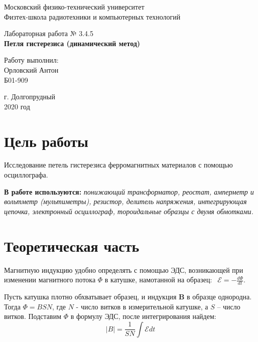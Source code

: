 \documentclass[a4paper,12pt]{article}
\begin{document}
\begin{titlepage}
	\begin{center}
		\large 	Московский физико-технический университет \\
		Физтех-школа радиотехники и компьютерных технологий\\
		\vspace{0.2cm}
		
		\vspace{4.5cm}
		Лабораторная работа № 3.4.5 \\ \vspace{0.2cm}
		\LARGE \textbf{Петля гистерезиса
		(динамический метод)}
	\end{center}
	\vspace{2.3cm} \large
	
	\begin{center}
		Работу выполнил: \\
		Орловский Антон \\
		Б01-909

		
	\end{center}
	
	\begin{center} \vspace{60mm}
		г. Долгопрудный \\
		 2020 год
	\end{center}
\end{titlepage}




\section{Цель работы} Исследование петель гистерезиса ферромагнитных материалов с помощью осциллографа.

\textbf{В работе используются:} \textit{понижающий трансформатор, реостат, амперметр и вольтметр (мультиметры), резистор, делитель напряжения, интегрирующая цепочка, электронный осциллограф, тороидальные образцы с двумя обмотками.}
	
\section{Теоретическая часть}		 
	Магнитную индукцию удобно определять с помощью ЭДС, возникающей при изменении магнитного потока $\Phi$ в катушке, намотанной на образец: $~~\mathscr{E}=-\frac{d\Phi}{dt}$.
	
	Пусть катушка плотно обхватывает образец, и индукция $\textbf{B}$
	в образце однородна. Тогда $\Phi=BSN$, где $N$ - число витков в измерительной катушке, а $S$ -- число витков.
	Подставим $\Phi$ в формулу ЭДС, после интегрирования найдем:
	$$|B|=\frac{1}{SN}\int\mathscr{E} dt$$
	
\end{document}
